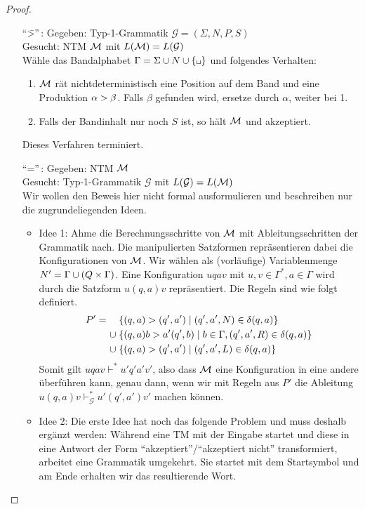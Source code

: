 \begin{proof}\
\begin{itemize}
	\item["`\=>"'\,:]
		Gegeben: Typ-1-Grammatik $\mathcal{G}=(\Sigma,N,P,S)$ \\
		Gesucht: \ac{NTM} $\mathcal{M}$ mit $L(\mathcal{M}) = L(\mathcal{G})$ \\
		Wähle das Bandalphabet $\Gamma = \Sigma\cup N\cup\{\blank\}$ und folgendes Verhalten:
		\begin{enumerate}
		\item $\mathcal{M}$ rät nichtdeterministisch eine Position auf
                  dem Band und eine Produktion $\alpha\-> \beta$. Falls $\beta$ gefunden wird, ersetze durch $\alpha$, weiter bei 1.
		\item Falls der Bandinhalt nur noch $S$ ist, so hält $\mathcal{M}$ und akzeptiert.
		\end{enumerate}
		Dieses Verfahren terminiert.
	\item["`\<="'\,:] %
	Gegeben: \ac{NTM} $\mathcal{M}$ \\
	Gesucht: Typ-1-Grammatik $\mathcal{G}$ mit $L(\mathcal{G})=L(\mathcal{M})$\\
	Wir wollen den Beweis hier nicht formal ausformulieren und beschreiben nur die zugrundeliegenden Ideen.
	\begin{itemize}
	\item Idee 1:
	Ahme die Berechnungsschritte von $\mathcal{M}$ mit Ableitungsschritten der Grammatik nach.
	Die manipulierten Satzformen repräsentieren dabei die Konfigurationen von $\mathcal{M}$.
	Wir wählen als (vorläufige) Variablenmenge $N'=\Gamma\cup(Q\times\Gamma)$.
	Eine Konfiguration $uqav$ mit $u,v\in\Gamma^*,a\in\Gamma$ wird durch die Satzform $u(q,a)v$ repräsentiert.
	Die Regeln sind wie folgt definiert.
	\begin{align*}
	 P' = \quad &\; \{ (q,a) \-> (q',a') \mid (q',a',N)\in \delta(q,a)\}\\
	 \cup &\; \{ (q,a)b \-> a'(q',b) \mid b\in\Gamma, (q',a',R)\in \delta(q,a) \}\\
	 \cup &\; \{ (q,a) \-> (q',a') \mid (q',a',L)\in \delta(q,a)\}
	\end{align*}
    Somit gilt $uqav \vdash^{*} u'q'a'v'$, also dass $\mathcal{M}$ eine Konfiguration in eine andere überführen kann, genau dann,
    wenn wir mit Regeln aus $P'$ die Ableitung $u(q,a)v \vdash_\mathcal{G}^{*} u'(q',a')v'$ machen können.

	
	\item Idee 2:
	Die erste Idee hat noch das folgende Problem und muss deshalb ergänzt werden:
	Während eine \ac{TM} mit der Eingabe startet und diese in eine Antwort der Form "`akzeptiert"'/"`akzeptiert nicht"' transformiert,
	arbeitet eine Grammatik umgekehrt. 
	Sie startet mit dem Startsymbol und am Ende erhalten wir das resultierende Wort.
	

\end{itemize}
\end{itemize}
\end{proof}
